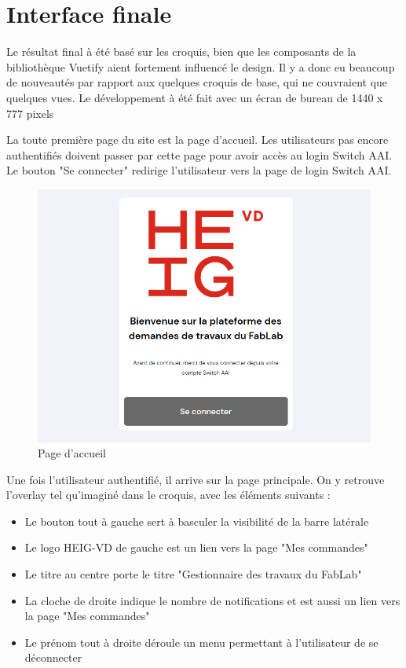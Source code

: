 \documentclass[
    iai, %
    eai, %
]{heig-tb}
\begin{document}
\newpage
\section{Interface finale}
Le résultat final à été basé sur les croquis, bien que les composants de la bibliothèque Vuetify aient fortement influencé le design.
Il y a donc eu beaucoup de nouveautés par rapport aux quelques croquis de base, qui ne couvraient que quelques vues.
Le développement à été fait avec un écran de bureau de 1440 x 777 pixels

La toute première page du site est la page d'accueil. Les utilisateurs pas encore authentifiés doivent passer par cette page pour avoir accès au login Switch AAI.
Le bouton "Se connecter" redirige l'utilisateur vers la page de login Switch AAI.

\begin{figure}[h]
  \includegraphics[width=14cm]{ui_welcome.PNG}
  \caption{Page d'accueil}
  \label{img:welcome}
\end{figure}

Une fois l'utilisateur authentifié, il arrive sur la page principale.
On y retrouve l'overlay tel qu'imaginé dans le croquis, avec les éléments suivants :
\begin{itemize}
  \item Le bouton tout à gauche sert à basculer la visibilité de la barre latérale
  \item Le logo HEIG-VD de gauche est un lien vers la page "Mes commandes"
  \item Le titre au centre porte le titre "Gestionnaire des travaux du FabLab"
  \item La cloche de droite indique le nombre de notifications et est aussi un lien vers la page "Mes commandes"
  \item Le prénom tout à droite déroule un menu permettant à l'utilisateur de se déconnecter
\end{itemize}
\bigskip
\end{document}
